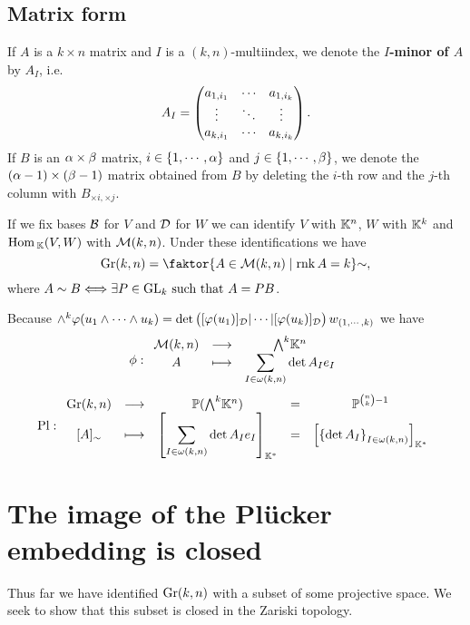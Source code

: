\subsection{Matrix form}
\begin{notation}
If $A$ is a $k\times n$ matrix and $I$ is a $(k,n)$-multiindex, we denote the \textbf{$I$-minor of $A$} by $A_I$, i.e.
\[A_I=\begin{pmatrix}a_{1,i_1} &\cdots &a_{1,i_{k}}\\\vdots &\ddots &\vdots\\a_{k,i_1}&\cdots&a_{k,i_k}\end{pmatrix}.\]
If $B$ is an $\alpha\times \beta$ matrix, $i\in\left\{{1,\cdots, \alpha}\right\}$ and $j\in \left\{{1,\cdots, \beta}\right\}$, we denote the $(\alpha-1)\times (\beta-1)$ matrix obtained from $B$ by deleting the $i$-th row and the $j$-th column with $B_{\times i,\times j}$.
\end{notation}
If we fix bases $\mathcal{B}$ for $V$ and $\mathcal{D}$ for $W$ we can identify $V$ with $\mathbb{K}^n$, $W$ with $\mathbb{K}^k$ and $\mathrm{Hom}\,_{\mathbb{K}}(V,W)$ with $\mathcal{M}(k,n)$. Under these identifications we have 
\[\Gr(k,n)=\quot{\cpa{A\in \Mc(k,n)\mid \rnk A=k}}{\sim},\] 
where $A\sim B\Longleftrightarrow \exists P\in \mathrm{GL}_k\text{ such that } A=PB$.\bigskip

Because $\wedge^k\varphi(u_1\wedge\cdots\wedge u_k)=\det\begin{pmatrix}[\varphi(u_1)]_{\mathcal{D}}|\cdots|[\varphi(u_k)]_{\mathcal{D}}\end{pmatrix} w_{(1,\cdots,k)}$ we have
\[\phi:\funcDef{\Mc(k,n)}{\bw \K^n}{A}{\displaystyle \sum_{I\in \omega(k,n)}\det A_I e_I}\]
\[\Pl:\begin{array}{ccccc}
{\Gr(k,n)} & \longrightarrow & {\Pj(\bw \K^n)} & = & \Pj^{\binom nk-1}\\
{[A]_\sim} & \longmapsto & {\displaystyle \spa{\sum_{I\in \omega(k,n)}\det A_I e_I}_{\K^\ast}} & = & \spa{\cpa{\det A_I}_{I\in\omega(k,n)}}_{\K^\ast}
\end{array}\]







\section{The image of the Pl\"ucker embedding is closed}\label{ImagePluckerEmbeddingIsClosed}
Thus far we have identified $\mathrm{Gr}(k,n)$ with a subset of some projective space. We seek to show that this subset is closed in the Zariski topology.

